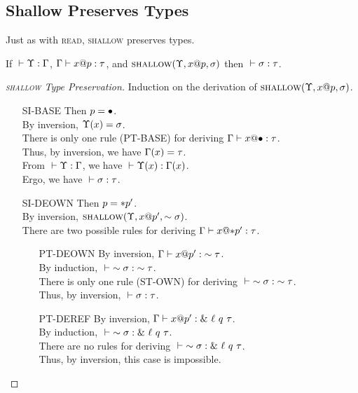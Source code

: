 \subsection*{Shallow Preserves Types}
Just as with \textsc{read}, \textsc{shallow} preserves types.

\begin{lem}
  If ${} \vdash {\Upsilon} : {\Gamma}$, ${\Gamma} \vdash {{x}@{p}} : {\tau}$, and $\textsc{shallow}({\Upsilon},{{x}@{p}},{\sigma})$
  then ${} \vdash {\sigma} : {\tau}$.
\end{lem}

\begin{proof}[\textsc{shallow} Type Preservation]
  Induction on the derivation of $\textsc{shallow}({\Upsilon},{{x}@{p}},{\sigma})$.
  \begin{itemize}
    \item[SI-BASE] Then $p = \bullet$. \\
      By inversion, $\Upsilon(x)=\sigma$. \\
      There is only one rule (\textsc{PT-BASE}) for deriving ${\Gamma} \vdash {{x}@{\bullet}} : {\tau}$. \\
      Thus, by inversion, we have $\Gamma(x)=\tau$. \\
      From ${} \vdash {\Upsilon} : {\Gamma}$, we have ${} \vdash {\Upsilon(x)} : {\Gamma(x)}$. \\
      Ergo, we have ${} \vdash {\sigma} : {\tau}$.
    \item[SI-DEOWN] Then $p = *{p'}$. \\
      By inversion, $\textsc{shallow}({\Upsilon},{{x}@{p'}},{\sim{\sigma}})$. \\
      There are two possible rules for deriving ${\Gamma} \vdash {{x}@{*{p'}}} : {\tau}$.
      \begin{itemize}
	\item[PT-DEOWN]
	  By inversion, ${\Gamma} \vdash {{x}@{p'}} : {\sim{\tau}}$. \\
	  By induction, ${} \vdash {\sim{\sigma}} : {\sim{\tau}}$. \\
	  There is only one rule (\textsc{ST-OWN}) for deriving ${} \vdash {\sim{\sigma}} : {\sim{\tau}}$. \\
	  Thus, by inversion, ${} \vdash {\sigma} : {\tau}$.
	\item[PT-DEREF]
	  By inversion, ${\Gamma} \vdash {{x}@{p'}} : {\&~{{\ell}~{q}~{\tau}}}$. \\
	  By induction, ${} \vdash {\sim{\sigma}} : {\&~{{\ell}~{q}~{\tau}}}$. \\
	  There are no rules for deriving ${} \vdash {\sim{\sigma}} : {\&~{{\ell}~{q}~{\tau}}}$. \\
	  Thus, by inversion, this case is impossible.
      \end{itemize}

\end{itemize}
\end{proof}

